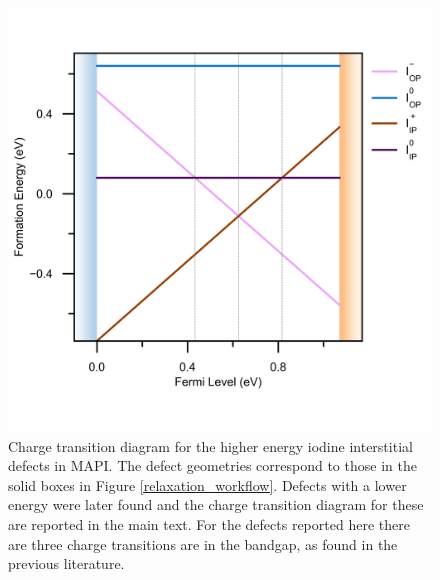 

\begin{figure}[h!] 
\centering
  \includegraphics[width=0.7\columnwidth]{figures/ap7/charge_transition_HSE_meta.png}
  \caption[Charge transition diagram for higher energy iodine interstitial defects in MAPI]{Charge transition diagram for the higher energy iodine interstitial defects in MAPI. The defect geometries correspond to those in the solid boxes in Figure \ref{relaxation_workflow}. Defects with a lower energy were later found and the charge transition diagram for these are reported in the main text. For the defects reported here there are three charge transitions are in the bandgap, as found in the previous literature.\autocite{Du2015,Meggiolaro2018}}
\label{charge_transition_meta}
\end{figure}
